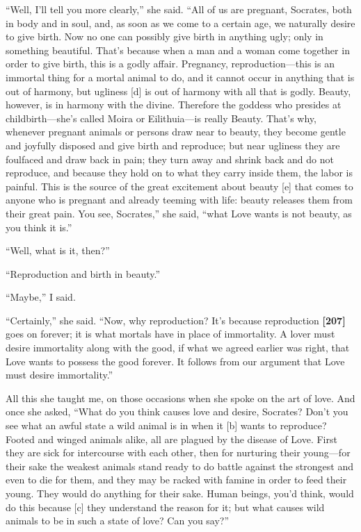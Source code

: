 “Well, I'll tell you more clearly,” she said. “All of us are pregnant,
Socrates, both in body and in soul, and, as soon as we come to a certain
age, we naturally desire to give birth. Now no one can possibly give
birth in anything ugly; only in something beautiful. That's because when
a man and a woman come together in order to give birth, this is a godly
affair. Pregnancy, reproduction---this is an immortal thing for a mortal
animal to do, and it cannot occur in anything that is out of harmony,
but ugliness {[}d{]} is out of harmony with all that is godly. Beauty,
however, is in harmony with the divine. Therefore the goddess who
presides at childbirth---she's called Moira or Eilithuia---is really
Beauty. That's why,
whenever pregnant animals or persons draw near to beauty, they become
gentle and joyfully disposed and give birth and reproduce; but near
ugliness they are foulfaced and draw back in pain; they turn away and
shrink back and do not reproduce, and because they hold on to what they
carry inside them, the labor is painful. This is the source of the great
excitement about beauty {[}e{]} that comes to anyone who is pregnant and
already teeming with life: beauty releases them from their great pain.
You see, Socrates,” she said, “what Love wants is not beauty, as you
think it is.”

“Well, what is it, then?”

“Reproduction and birth in beauty.”

“Maybe,” I said.

“Certainly,” she said. “Now, why reproduction? It's because reproduction
{\bf {[}207{]}} goes on forever; it is what mortals have in place of
immortality. A lover must desire immortality along with the good, if
what we agreed earlier was right, that Love wants to possess the good
forever. It follows from our argument that Love must desire
immortality.”

All this she taught me, on those occasions when she spoke on the art of
love. And once she asked, “What do you think causes love and desire,
Socrates? Don't you see what an awful state a wild animal is in when it
{[}b{]} wants to reproduce? Footed and winged animals alike, all are
plagued by the disease of Love. First they are sick for intercourse with
each other, then for nurturing their young---for their sake the weakest
animals stand ready to do battle against the strongest and even to die
for them, and they may be racked with famine in order to feed their
young. They would do anything for their sake. Human beings, you'd think,
would do this because {[}c{]} they understand the reason for it; but
what causes wild animals to be in such a state of love? Can you say?”

